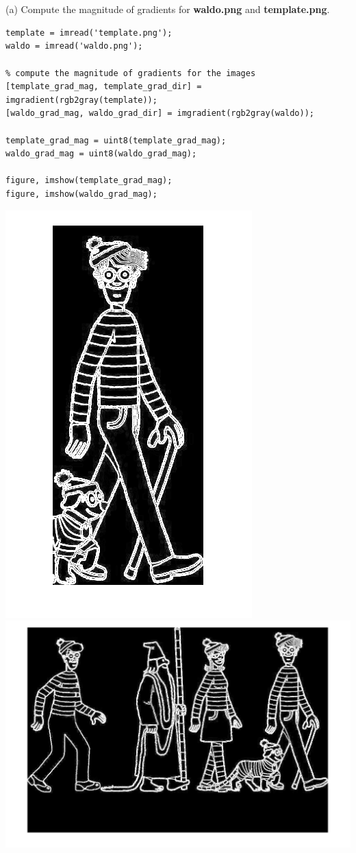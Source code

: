 \documentclass[11pt]{article}
\begin{document}
\section{}
(a) Compute the magnitude of gradients for \textbf{waldo.png} and \textbf{template.png}.
\begin{lstlisting}
template = imread('template.png');
waldo = imread('waldo.png');

% compute the magnitude of gradients for the images
[template_grad_mag, template_grad_dir] = imgradient(rgb2gray(template));
[waldo_grad_mag, waldo_grad_dir] = imgradient(rgb2gray(waldo));

template_grad_mag = uint8(template_grad_mag);
waldo_grad_mag = uint8(waldo_grad_mag);

figure, imshow(template_grad_mag);
figure, imshow(waldo_grad_mag);
\end{lstlisting}
\includegraphics[scale=0.5]{templateGrad}
\\
\includegraphics[scale=0.5]{waldoGrad}
\end{document}

